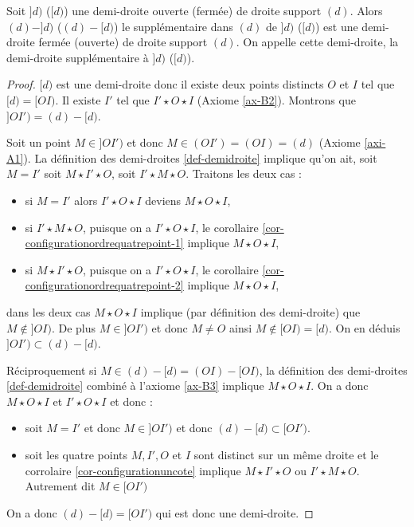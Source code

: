 \begin{prop}
    Soit $]d)$ ($[d)$) une demi-droite ouverte (fermée) de droite support $(d)$. Alors $(d)-]d)$ ($(d)-[d)$) le supplémentaire dans $(d)$ de $]d)$ ($[d)$) est une demi-droite fermée (ouverte) de droite support $(d)$. On appelle cette demi-droite, la demi-droite supplémentaire  à $]d)$ ($[d)$).

    \begin{proof}
        $[d)$ est une demi-droite donc il existe deux points distincts $O$ et $I$ tel que $[d)=[OI)$. Il existe $I'$ tel que $I' \star O \star I$ (Axiome \ref{ax-B2}). Montrons que $]OI') = (d)-[d)$.

        Soit un point $M\in ]OI')$ et donc $M\in (OI')=(OI)=(d)$ (Axiome \ref{axi-A1}). La définition des demi-droites \ref{def-demidroite} implique qu'on ait, soit $M=I'$ soit  $M\star I' \star O$, soit $I' \star M \star O$. Traitons les deux cas : 
        \begin{itemize}[$\bullet$]
            \item si $M=I'$ alors $I' \star O \star I$ deviens $M\star O\star I$,
            \item si $I' \star M \star O$, puisque on a $I' \star O \star I$, le corollaire \ref{cor-configurationordrequatrepoint-1} implique $M\star O\star I$, 
            \item si $M \star I' \star  O$, puisque on a $I' \star O \star I$, le corollaire \ref{cor-configurationordrequatrepoint-2} implique $M\star O\star I$,
        \end{itemize}
        dans les deux cas $M\star O\star I$ implique (par définition des demi-droite) que $M \notin ]OI)$. De plus $M\in ]OI')$ et donc $M\neq O$ ainsi $M\notin [OI)=[d)$. On en déduis $]OI') \subset (d)-[d)$.

        Réciproquement si $M \in (d)-[d)=(OI)-[OI)$, la définition des demi-droites \ref{def-demidroite} combiné à l'axiome \ref{ax-B3} implique $M \star O \star I$. On a donc $M\star O\star I$ et $I'\star O \star I$ et donc :
        \begin{itemize}[$\bullet$]
            \item soit $M = I'$ et donc $M\in ]OI')$ et donc $(d)-[d) \subset [OI')$. 
            \item soit les quatre points $M,I',O $ et $I$ sont distinct sur un même droite et le corrolaire \ref{cor-configurationuncote} implique $M \star I' \star O$ ou $I'\star M\star O$. Autrement dit $M \in [OI')$ 
        \end{itemize}
        
        On a donc $(d)-[d) = [OI')$ qui est donc une demi-droite.
    \end{proof}
\end{prop}
